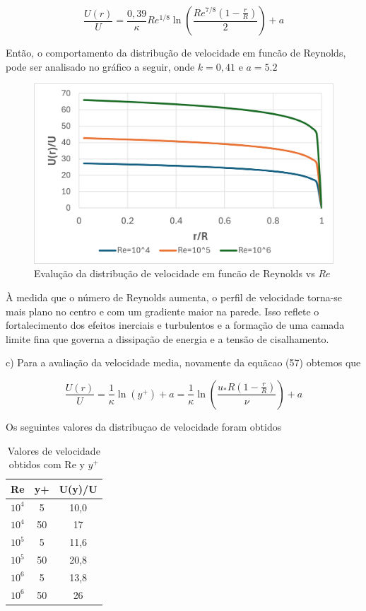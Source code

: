 \documentclass[12pt]{article}
\begin{document}
\begin{equation}
	\frac{U(r)}{U} = \frac{0,39}{\kappa} Re^{1/8} \ln\left( \frac{Re^{7/8}(1-\frac{r}{R})}{2} \right) + a
\end{equation}

Então, o comportamento da distribução de velocidade em funcão de Reynolds, pode ser analisado no gráfico a seguir, onde $k = 0,41$ e $a=5.2$

\begin{figure}[H]
	\centering
	\includegraphics[width=.65\textwidth]{figures/2}
	\caption{Evalução da distribução de velocidade em funcão de Reynolds vs $Re$}
\end{figure}


À medida que o número de Reynolds aumenta, o perfil de velocidade torna-se mais plano no centro e com um gradiente maior na parede. Isso reflete o fortalecimento dos efeitos inerciais e turbulentos e a formação de uma camada limite fina que governa a dissipação de energia e a tensão de cisalhamento.

c) Para a avaliação da velocidade media, novamente da equãcao (57) obtemos que 

\begin{equation}
	\frac{U(r)}{U} = \frac{1}{\kappa} \ln\left( y^+ \right) + a = \frac{1}{\kappa} \ln\left( \frac{u_*R(1-\frac{r}{R})}{\nu} \right) + a
\end{equation}

Os seguintes valores da distribuçao de velocidade foram obtidos

\begin{table}[H]
	\centering
	\begin{tabular}{|c|c|c|}
		\hline
		Re  & y+ & U(y)/U \\ \hline
		$10^4$   & 5   & 10,0   \\ \hline
		$10^4$   & 50   & 17 \\ \hline
		$10^5$   & 5    & 11,6    \\ \hline
		$10^5$    & 50   & 20,8  \\ \hline
		$10^6$   & 5    & 13,8    \\ \hline
		$10^6$    & 50   & 26   \\ \hline
	\end{tabular}
	\caption{Valores de velocidade obtidos com Re y $y^+$}
\end{table} 
\end{document}
